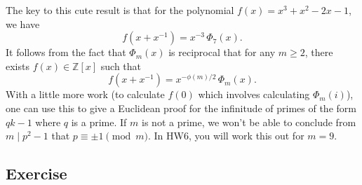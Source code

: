 \documentclass{article}
\def\Z{{\mathbb Z}}
\def\Z{{\mathbb Z}}
\begin{document}
The key to this cute result is that for the polynomial $f(x) = x^3 + x^2 - 2x - 1$, we have
$$f(x + x^{-1}) = x^{-3}\,\Phi_7(x).$$
It follows from the fact that $\Phi_m(x)$ is reciprocal that for any $m\geq 2$, there exists $f(x)\in\Z[x]$ such that
$$f(x + x^{-1}) = x^{-\phi(m)/2}\,\Phi_m(x).$$
With a little more work (to calculate $f(0)$ which involves calculating $\Phi_m(i)$), one can use this to give a Euclidean proof for the infinitude of primes of the form $qk - 1$ where $q$ is a prime. If $m$ is not a prime, we won't be able to conclude from $m\mid p^2 - 1$ that $p\equiv \pm1\pmod{m}$. In HW6, you will work this out for $m = 9$.

\subsection*{Exercise}
\end{document}
